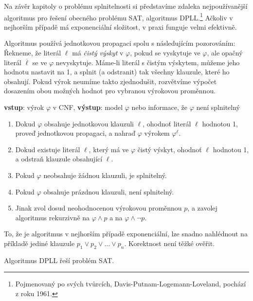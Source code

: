 Na závěr kapitoly o problému splnitelnosti si představíme zdaleka nejpoužívanější algoritmus pro řešení obecného problému SAT, algoritmus DPLL.\footnote{Pojmenovaný po svých tvůrcích, Davis-Putnam-Logemann-Loveland, pochází z roku 1961.} Ačkoliv v nejhorším případě má exponenciální složitost, v praxi funguje velmi efektivně.

Algoritmus používá jednotkovou propagaci spolu s následujícím pozorováním: Řekneme, že literál $\ell$ má \emph{čistý výskyt} v $\varphi$, pokud se vyskytuje ve $\varphi$, ale opačný literál $\overline{\ell}$ se ve $\varphi$ nevyskytuje. Máme-li literál s čistým výskytem, můžeme jeho hodnotu nastavit na 1, a splnit (a odstranit) tak všechny klauzule, které ho obsahují. Pokud výrok neumíme takto zjednodušit, rozvětvíme výpočet dosazením obou možných hodnot pro vybranou výrokovou proměnnou.

\begin{algorithm}[DPLL]
    \textbf{vstup}: výrok $\varphi$ v CNF, \textbf{výstup}: model $\varphi$ nebo informace, že  $\varphi$ není splnitelný
    \begin{enumerate}                
        \item Dokud $\varphi$ obsahuje jednotkovou klauzuli $\ell$, ohodnoť literál $\ell$ hodnotou 1, proveď jednotkovou propagaci, a nahraď $\varphi$ výrokem $\varphi^\ell$.
         \item Dokud existuje literál $\ell$, který má ve $\varphi$ čistý výskyt, ohodnoť $\ell$ hodnotou 1, a odstraň klauzule obsahující $\ell$.
        \item Pokud $\varphi$ neobsahuje žádnou klauzuli, je splnitelný.
        \item Pokud $\varphi$ obsahuje prázdnou klauzuli, není splnitelný.
        \item Jinak zvol dosud neohodnocenou výrokovou proměnnou $p$, a zavolej algoritmus rekurzivně na $\varphi\land p$ a na $\varphi\land \neg p$.
    \end{enumerate}
\end{algorithm}

To, že je algoritmus v nejhorším případě exponenciální, lze snadno nahlédnout na příkladě jediné klauzule $p_1\lor p_2\lor\dots\lor p_n$. Korektnost není těžké ověřit.

\begin{proposition}
    Algoritmus DPLL řeší problém SAT.
\end{proposition}
    
